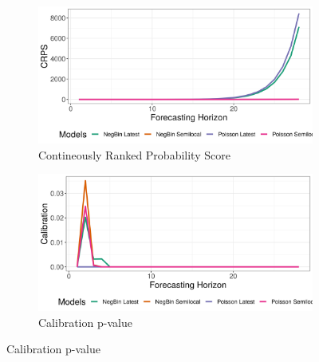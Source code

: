 \begin{figure}[H]
\begin{subfigure}{0.5\textwidth}
  \centering
  \includegraphics[width=\linewidth]{../output/Katwa_crps.png}  
  \caption{Contineously Ranked Probability Score}
  \label{Katwa_scores_1}
\end{subfigure}
\begin{subfigure}{0.5\textwidth}
  \centering
  \includegraphics[width=\linewidth]{../output/Katwa_calibration.png}  
  \caption{Calibration p-value}
  \label{Katwa_scores_2}
\end{subfigure}


\end{figure}
